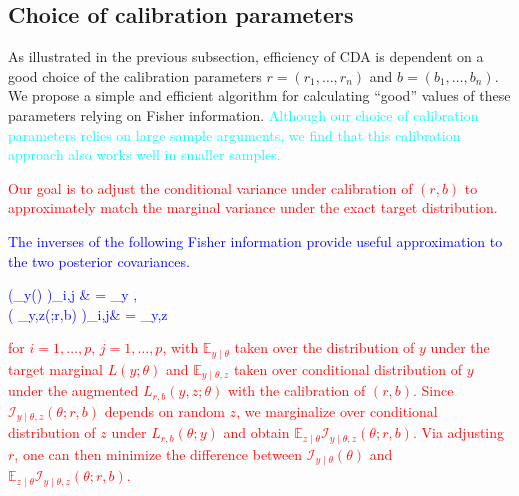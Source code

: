 \documentclass[11pt]{article}
\newcommand{\leojames}[1]{\textcolor{blue}{#1}}
\newcommand{\leo}[1]{{\textcolor{red}{#1}}}
\newcommand{\dave}[1]{{\textcolor{cyan}{#1}}}
\newcommand{\be}{\begin{equs}}
\newcommand{\ee}{\end{equs}}
\newcommand{\bb}[1]{\mathbb{#1}}
\newcommand{\mc}[1]{\mathcal{#1}}
\begin{document}
\subsection{Choice of calibration parameters} \label{sec:tuning}
As illustrated in the previous subsection, efficiency of CDA is dependent on a good choice of the calibration parameters $r=(r_1,\ldots,r_n)$ and $b=(b_1,\ldots,b_n)$.  We propose a simple and efficient algorithm for calculating ``good'' values of these parameters relying on Fisher information.  \dave{Although our choice of calibration parameters relies on large sample arguments, we find that this calibration approach also works well in smaller samples.}

\leo{
Our
goal is to adjust the conditional variance under calibration of $(r,b)$ to approximately match the marginal variance under the exact target distribution.
\leojames{
The inverses of the following Fisher information provide  useful approximation to the two posterior covariances.\be   \left (\mc I_{y\mid \theta}({\theta}) \right)_{i,j} &  = \bb E_{y\mid \theta} \left[ \left( \frac{\partial}{\partial \theta_i} \log L(y;\theta) \right) \left( \frac{\partial}{\partial \theta_j} \log L(y;\theta) \right) \right], \\
 \left(  \mc I_{y\mid \theta,z}({\theta};r,b) \right)_{i,j}& = \bb E_{y\mid \theta,z} \left[ \left( \frac{\partial}{\partial \theta_i} \log L_{r,b}(y,z;\theta) \right)\left( \frac{\partial}{\partial \theta_j} \log L_{r,b}(y,z;\theta) \right) \right]
\ee
}
for $i=1,\ldots,p$, $j=1,\ldots,p$, with $\bb E_{y\mid \theta}$ taken over the distribution of $y$ under the target marginal $L(y;\theta)$ and $\bb E_{y\mid \theta,z}$ taken over conditional distribution of $y$ under the augmented $L_{r,b}(y,z;\theta)$ with the calibration of $(r,b)$.
Since $\mc I_{y\mid \theta,z}({\theta};r,b)$ depends on random $z$, we marginalize over
 conditional distribution
of $z$ under $L_{r,b}(\theta; y)$ and obtain $\bb E_{z\mid \theta}\mc I_{y\mid \theta,z}(\theta;r,b)$. Via adjusting $r$, one can then  minimize the difference between $\mc  I_{y\mid \theta}(\theta)$
and $\bb E_{z\mid \theta}\mc I_{y\mid \theta,z}(\theta;r,b)$.}
\end{document}
